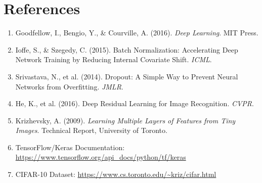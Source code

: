\documentclass[11pt]{article}
\begin{document}
\section{References}
\begin{enumerate}
    \item Goodfellow, I., Bengio, Y., \& Courville, A. (2016). \textit{Deep Learning}. MIT Press.
    \item Ioffe, S., \& Szegedy, C. (2015). Batch Normalization: Accelerating Deep Network Training by Reducing Internal Covariate Shift. \textit{ICML}.
    \item Srivastava, N., et al. (2014). Dropout: A Simple Way to Prevent Neural Networks from Overfitting. \textit{JMLR}.
    \item He, K., et al. (2016). Deep Residual Learning for Image Recognition. \textit{CVPR}.
    \item Krizhevsky, A. (2009). \textit{Learning Multiple Layers of Features from Tiny Images}. Technical Report, University of Toronto.
    \item TensorFlow/Keras Documentation: \url{https://www.tensorflow.org/api_docs/python/tf/keras}
    \item CIFAR-10 Dataset: \url{https://www.cs.toronto.edu/~kriz/cifar.html}
\end{enumerate}
\end{document}
